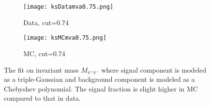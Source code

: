 
\begin{figure}[htpb]
	\begin{subfigure}{0.5\linewidth}
		\caption{Data, cut=0.74}
		\texttt{[image: ksDatamva0.75.png]}
	\end{subfigure}
\begin{subfigure}{0.5\linewidth}
	\caption{MC, cut=0.74}
	\texttt{[image: ksMCmva0.75.png]}
\end{subfigure}
\caption{The fit on invariant mass $M_{\pi^+\pi^-}$ where signal component is modeled as a triple-Gaussian and background component is modeled as a Chebyshev polynomial. The signal fraction is slight higher in MC compared to that in data.}
\label{fig:Rfit}
\end{figure}

\begin{comment}
\begin{subfigure}{0.5\linewidth}
\caption{Data,cut=0.9}
\texttt{[image: ksDatamva0.9.png]}
\end{subfigure}
\begin{subfigure}{0.5\linewidth}
\caption{MC,cut=0.9}
\texttt{[image: ksMCmva0.9.png]}
\end{subfigure}
\caption{Invariant mass fit of $K_S^0$ using cut at 0.2(loose) and 0.9(tight) to calculate $S_{data/MC}$.}
\end{figure}
\end{comment}

\begin{comment}
\subsection{Summary}
The development of Belle II $K_S^0$ classifier is enlighten by the experience from Belle. A comprehensive study of training observables from $K_S^0$ decay characteristics has been exploited. It takes the advantage of FastBDT algorithm to achieve a high fake rejection power. As a result, classifier is able to give a output which can be used as a cut to select good $K_S^0$ candidates with high purity. The classifier is validated with real experimental data as well. A primary data validation study of\textit{KsFinder}is conducted with implementing correction on data and MC along with its contribution to $B^0$. The performance of\textit{KsFinder}is in a good shape and no clear bias is found on the yield of the number of $K_S^0$. For the reconstruction of $B^0 \to K_S^0  K_S^0  K_S^0$, the development of\textit{KsFinder}is critical to suppress large fraction of combination background from fake $K_S^0$.
\end{comment}
